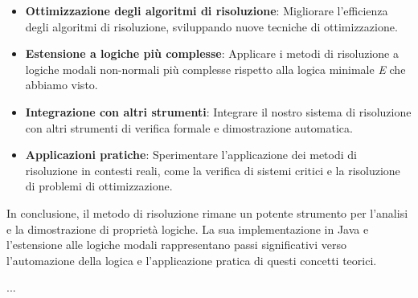 \documentclass[a4paper,12pt]{report}
\begin{document}
\begin{itemize}
    \item \textbf{Ottimizzazione degli algoritmi di risoluzione}: Migliorare l'efficienza degli algoritmi di risoluzione, sviluppando nuove tecniche di ottimizzazione.
    \item \textbf{Estensione a logiche più complesse}: Applicare i metodi di risoluzione a logiche modali non-normali più complesse rispetto alla logica minimale \emph{E} che abbiamo visto.
    \item \textbf{Integrazione con altri strumenti}: Integrare il nostro sistema di risoluzione con altri strumenti di verifica formale e dimostrazione automatica.
    \item \textbf{Applicazioni pratiche}: Sperimentare l'applicazione dei metodi di risoluzione in contesti reali, come la verifica di sistemi critici e la risoluzione di problemi di ottimizzazione.
\end{itemize}
In conclusione, il metodo di risoluzione rimane un potente strumento per l'analisi e la dimostrazione di proprietà logiche. La sua implementazione in Java e l'estensione alle logiche modali rappresentano passi significativi verso l'automazione della logica e l'applicazione pratica di questi concetti teorici.






%
%





%
%
...
\end{document}
